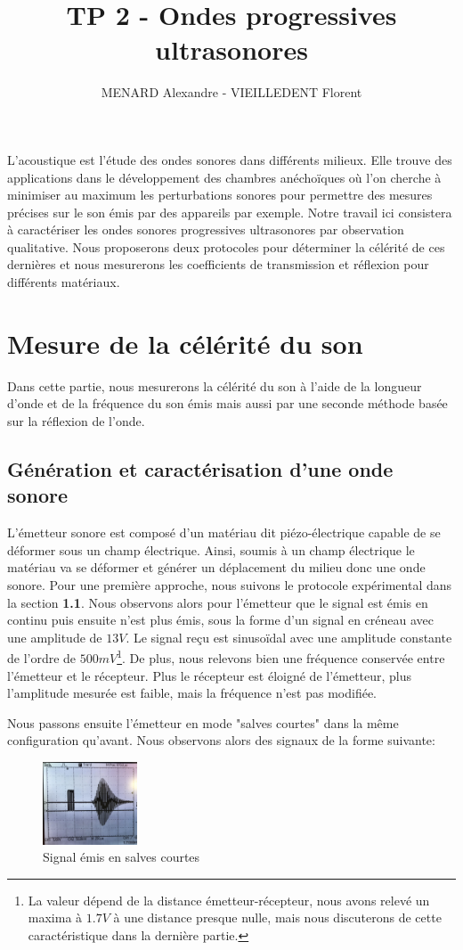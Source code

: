 \documentclass[12pt]{article}
\title{\vspace{-2cm}\textbf{TP 2 - Ondes progressives ultrasonores}}
\author{\vspace{-0.5cm}MENARD Alexandre - VIEILLEDENT Florent}
\date{\vspace{-0.7cm}}
\begin{document}
\maketitle

L'acoustique est l'étude des ondes sonores dans différents milieux. Elle trouve des applications dans le développement des chambres
anéchoïques où l'on cherche à minimiser au maximum les perturbations sonores pour permettre des mesures précises sur le son émis par des appareils par exemple. 
Notre travail ici consistera à caractériser les ondes sonores progressives ultrasonores par observation qualitative. Nous proposerons
deux protocoles pour déterminer la célérité de ces dernières et nous mesurerons les coefficients de transmission et réflexion pour différents matériaux.

\section{Mesure de la célérité du son}
Dans cette partie, nous mesurerons la célérité du son à l'aide de la longueur d'onde et de la fréquence du son émis mais aussi par une seconde méthode basée sur la réflexion de l'onde.

\subsection{Génération et caractérisation d'une onde sonore}
L'émetteur sonore est composé d'un matériau dit piézo-électrique capable de se déformer sous un champ électrique. Ainsi, soumis à un champ électrique
le matériau va se déformer et générer un déplacement du milieu donc une onde sonore. Pour une première approche, nous suivons le protocole
expérimental dans la section \textbf{1.1}. Nous observons alors pour l'émetteur que le signal est émis en continu puis ensuite n'est plus émis, sous la forme d'un signal en créneau avec une amplitude de $13V$.
Le signal reçu est sinusoïdal avec une amplitude constante de l'ordre de $500mV$\footnote{La valeur dépend de la distance émetteur-récepteur, nous avons relevé un maxima à $1.7V$ à une distance presque nulle, mais nous discuterons de cette caractéristique dans la dernière partie.}. De plus, nous relevons bien une fréquence conservée entre l'émetteur et le récepteur. Plus le récepteur est éloigné de l'émetteur, plus l'amplitude mesurée est faible, mais la fréquence n'est pas modifiée.

Nous passons ensuite l'émetteur en mode "salves courtes" dans la même configuration qu'avant. Nous observons alors des signaux de la forme suivante:
\begin{figure}[!htbp]
	\centering
	\includegraphics[width=0.25\textwidth]{img/salves_courtes.jpg}
	\hfill
	\caption{Signal émis en salves courtes}
\end{figure}
\end{document}
